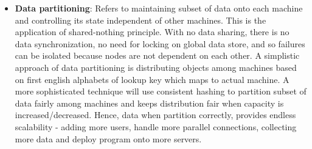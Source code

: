 \begin{itemize}
\begin{figure}[h!]
    \caption{Functional Partitioning in Netflix as an example}
    \label{fig:netflix}
  \end{figure}
Figure \ref{fig:netflix} shows how a netflix streaming service is divided into two major subsystems -
the video processor and the content streamer. This brings a lot of benefits but also increasing
engineering challenges. The main benefits are both service operate independently, parallel teams work
on independent codebases. Each service scales independently of other.
\item \textbf{Data partitioning}: Refers to maintaining subset of data onto each machine and controlling
  its state independent of other machines. This is the application of shared-nothing principle. With no
  data sharing, there is no data synchronization, no need for locking on global data store, and so
  failures can be isolated because nodes are not dependent on each other. A simplistic approach of data
  partitioning is distributing objects among machines based on first english alphabets of lookup key
  which maps to actual machine. A more sophisticated technique will use consistent hashing to partition
  subset of data fairly among machines and keeps distribution fair when capacity is increased/decreased.
  Hence, data when partition correctly, provides endless scalability - adding more users, handle more
  parallel connections, collecting more data and deploy program onto more servers.
\end{itemize}

\pagebreak

